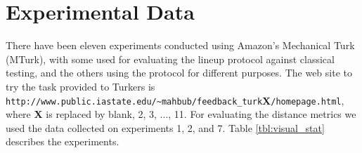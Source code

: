 \documentclass[12]{article}
\begin{document}
\section{Experimental Data} \label{sec:expts}

There have been eleven experiments conducted using Amazon's Mechanical Turk~\citep{turk} (MTurk), with some used for evaluating the lineup protocol against classical testing, and the others using the protocol for different purposes. The web site to try the task provided to Turkers is \\{\verb#http://www.public.iastate.edu/~mahbub/feedback_turk#{\bf X}\verb#/homepage.html#}, 
where {\bf X} is replaced by blank, 2, 3, ..., 11. For evaluating the distance metrics we used the data collected on experiments 1, 2, and 7. Table \ref{tbl:visual_stat} describes the experiments.

\end{document}
